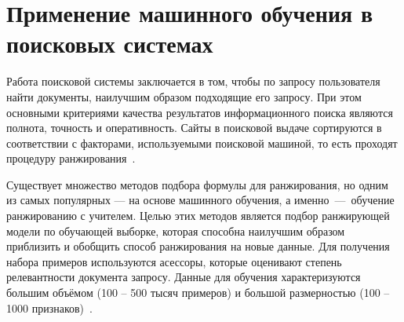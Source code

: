 \section{Применение машинного обучения в поисковых системах}

Работа поисковой системы заключается в том, чтобы по запросу пользователя найти документы, наилучшим образом подходящие его запросу. При этом основными критериями качества результатов информационного поиска являются полнота, точность и оперативность. Сайты в поисковой выдаче сортируются в соответствии с факторами, используемыми поисковой машиной, то есть проходят процедуру ранжирования~\cite{ML_for_rank}.

Существует множество методов подбора формулы для ранжирования, но одним из самых популярных --- на основе машинного обучения, а именно~---~обучение ранжированию с учителем. Целью этих методов является подбор ранжирующей модели по обучающей выборке, которая способна наилучшим образом приблизить и обобщить способ ранжирования на новые данные. Для получения набора примеров используются асессоры, которые оценивают степень релевантности документа запросу. Данные для обучения характеризуются большим объёмом (100 -- 500 тысяч примеров) и большой размерностью (100 -- 1000 признаков)~\cite{ML_for_rank}.

